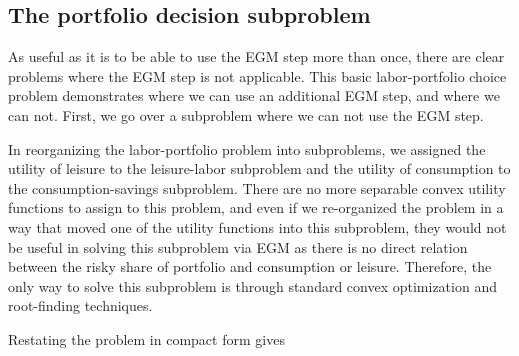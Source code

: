 \documentclass[\econtexRoot/SequentialEGM]{subfiles}
\begin{document}
%

\subsection{The portfolio decision subproblem}

As useful as it is to be able to use the EGM step more than once, there are clear problems where the EGM step is not applicable. This basic labor-portfolio choice problem demonstrates where we can use an additional EGM step, and where we can not. First, we go over a subproblem where we can not use the EGM step.

In reorganizing the labor-portfolio problem into subproblems, we assigned the utility of leisure to the leisure-labor subproblem and the utility of consumption to the consumption-savings subproblem. There are no more separable convex utility functions to assign to this problem, and even if we re-organized the problem in a way that moved one of the utility functions into this subproblem, they would not be useful in solving this subproblem via EGM as there is no direct relation between the risky share of portfolio and consumption or leisure. Therefore, the only way to solve this subproblem is through standard convex optimization and root-finding techniques.

Restating the problem in compact form gives
\end{document}
